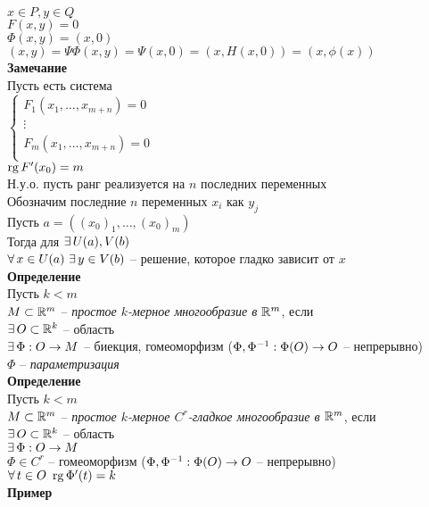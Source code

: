 \documentclass[12pt]{article}
\begin{document}
$x \in P, y \in Q$\\
$F(x,y) = 0$\\
$\Phi(x,y) = (x,0)$\\
$(x,y) = \Psi\Phi(x,y) = \Psi(x,0) = (x, H(x,0)) = (x, \phi(x))$\\
\textbf{Замечание}\\
Пусть есть система\\
$\left\{\begin{array}{l}
    F_1(x_1, \ldots, x_{m+n}) = 0\\
    \vdots\\
    F_m(x_1, \ldots, x_{m+n}) = 0\\
\end{array}\right.$\\
$\operatorname{rg} F'(x_0) = m$\\
Н.у.о. пусть ранг реализуется на $n$ последних переменных\\
Обозначим последние $n$ переменных $x_i$ как $y_{j}$\\
Пусть $a = ((x_0)_1, \ldots, (x_0)_m)$\\
Тогда для $\exists\, U(a), V(b)$\\
$\forall\, x \in U(a)\ \exists\, y\in V(b)$ -- решение, которое гладко зависит от $x$\\
\textbf{Определение}\\
Пусть $k < m$\\
$M \subset \mathbb{R}^m$ -- \textit{простое $k$-мерное многообразие в $\mathbb{R}^m$}, если\\
$\exists\, O \subset \mathbb{R}^k$ -- область\\
$\exists\, \Phi: O \rightarrow M$ -- биекция, гомеоморфизм ($\Phi, \Phi^{-1}: \Phi(O)\rightarrow O$ -- непрерывно)\\
$\Phi$ -- \textit{параметризация}\\
\textbf{Определение}\\
Пусть $k < m$\\
$M \subset \mathbb{R}^m$ -- \textit{простое $k$-мерное $C^r$-гладкое многообразие в $\mathbb{R}^m$}, если\\
$\exists\, O \subset \mathbb{R}^k$ -- область\\
$\exists\, \Phi: O \rightarrow M$\\
$\Phi \in C^r$ -- гомеоморфизм ($\Phi, \Phi^{-1}: \Phi(O)\rightarrow O$ -- непрерывно)\\
$\forall\, t \in O\ \operatorname{rg} \Phi'(t) = k$\\
\textbf{Пример}
\end{document}
